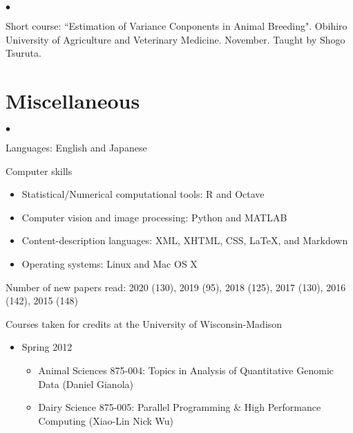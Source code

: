 \documentclass[margin,line,10pt]{res}
\newenvironment{list2}{
  \begin{list}{$\bullet$}{%
      \setlength{\itemsep}{0in}
      \setlength{\parsep}{0in} \setlength{\parskip}{0in}
      \setlength{\topsep}{0in} \setlength{\partopsep}{0in} 
      \setlength{\leftmargin}{0.2in}}}{\end{list}}
\begin{document}
\begin{resume}
\section{}
\begin{list2}
\item Short course: ``Estimation of Variance Conponents in Animal Breeding". Obihiro University of Agriculture and Veterinary Medicine. November. 
Taught by Shogo Tsuruta.  
\end{list2}  



\vspace{0.5cm}
\section{\sc Miscellaneous} 
\begin{list2}

\item Languages: English and Japanese
  \vspace{0.3cm}

\item Computer skills 
  \begin{itemize}
  \item Statistical/Numerical computational tools: R and Octave
  \item Computer vision and image processing: Python and MATLAB
  \item Content-description languages: XML, XHTML, CSS, \LaTeX, and Markdown
  \item Operating systems: Linux and Mac OS X
  \end{itemize}


  \vspace{0.3cm}
\item Number of new papers read: 2020 (130), 2019 (95), 2018 (125), 2017 (130), 2016 (142), 2015 (148)


  \vspace{0.3cm}
\item Courses taken for credits at the University of Wisconsin-Madison 
  \begin{itemize}

\item Spring 2012
\begin{itemize}
\item    Animal Sciences 875-004: Topics in Analysis of Quantitative Genomic Data (Daniel Gianola)
\item    Dairy Science 875-005: Parallel Programming \& High Performance Computing (Xiao-Lin Nick Wu)
\end{itemize}



\end{itemize}
\end{list2}
\end{resume}
\end{document}
